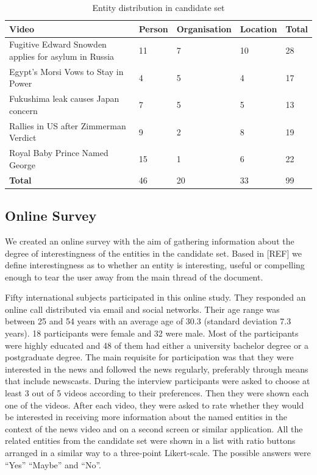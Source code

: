 \documentclass{llncs}
\begin{document}
\begin{table}[h]
\begin{tabular}{| p{6cm} | l| l| l| l|}
  \hline
  \textbf{Video} & \textbf{Person} & \textbf{Organisation} &\textbf{Location} & \textbf{Total} \\
    \hline
  Fugitive Edward Snowden applies for asylum in Russia & 11 & 7 & 10 & 28 \\
    \hline
 Egypt's Morsi Vows to Stay in Power & 4 & 5 & 4 & 17 \\
    \hline
 Fukushima leak causes Japan concern & 7 & 5 & 5 & 13\\
    \hline
 Rallies in US after Zimmerman Verdict & 9 & 2 & 8 & 19 \\
    \hline
 Royal Baby Prince Named George & 15 & 1 & 6 & 22 \\
    \hline
    \textbf{Total}  & 46 & 20 & 33 & 99\\
  \hline
\end{tabular}
\caption[Table caption text]{Entity distribution in candidate set}
\label{table:entitydistribution}
\end{table}

\subsection{Online Survey}
We created an online survey with the aim of gathering information about the degree of interestingness of the entities in the candidate set. Based in [REF] we define interestingness as to whether an entity is interesting, useful or compelling enough to tear the user away from the main thread of the document. 

Fifty international subjects participated in this online study. They responded an online call distributed via email and social networks. Their age range was between 25 and 54 years with an average age of 30.3 (standard deviation 7.3 years). 18 participants were female and 32 were male. Most of the participants were highly educated and 48 of them had either a university bachelor degree or a postgraduate degree. The main requisite for participation was that they were interested in the news and followed the news regularly, preferably through means that include newscasts.
During the interview participants were asked to choose at least 3 out of 5 videos according to their preferences. Then they were shown each one of the videos. After each video, they were asked to rate whether they would be interested in receiving more information about the named entities in the context of the news video and on a second screen or similar application. All the related entities from the candidate set were shown in a list with ratio buttons arranged in a similar way to a three-point Likert-scale. The possible answers were “Yes” “Maybe” and “No”. 
\end{document}
